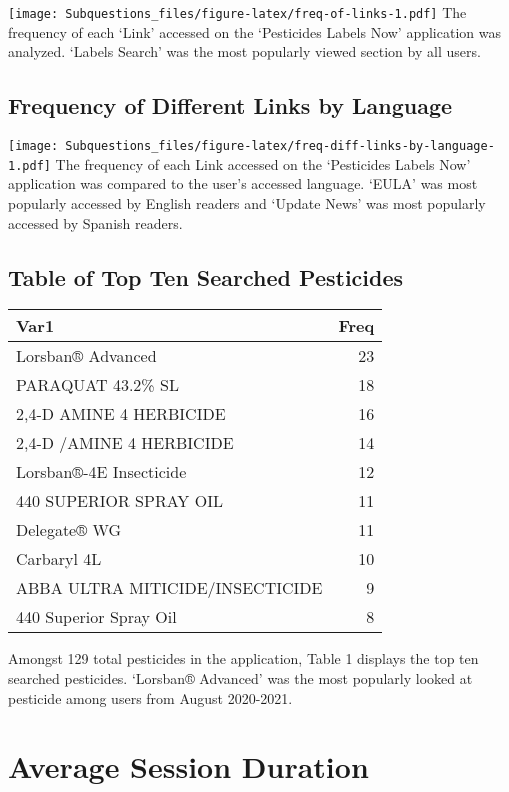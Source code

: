 \documentclass[
]{article}
\begin{document}
\texttt{[image: Subquestions\_files/figure-latex/freq-of-links-1.pdf]}
The frequency of each `Link' accessed on the `Pesticides Labels Now'
application was analyzed. `Labels Search' was the most popularly viewed
section by all users.

\hypertarget{frequency-of-different-links-by-language}{%
\subsection{Frequency of Different Links by
Language}\label{frequency-of-different-links-by-language}}

\texttt{[image: Subquestions\_files/figure-latex/freq-diff-links-by-language-1.pdf]}
The frequency of each Link accessed on the `Pesticides Labels Now'
application was compared to the user's accessed language. `EULA' was
most popularly accessed by English readers and `Update News' was most
popularly accessed by Spanish readers.

\hypertarget{table-of-top-ten-searched-pesticides}{%
\subsection{Table of Top Ten Searched
Pesticides}\label{table-of-top-ten-searched-pesticides}}

\begin{tabular}{l|r}
\hline
Var1 & Freq\\
\hline
Lorsban® Advanced & 23\\
\hline
PARAQUAT 43.2\% SL & 18\\
\hline
2,4-D AMINE 4 HERBICIDE & 16\\
\hline
2,4-D /AMINE 4 HERBICIDE & 14\\
\hline
Lorsban®-4E Insecticide & 12\\
\hline
440 SUPERIOR SPRAY OIL & 11\\
\hline
Delegate® WG & 11\\
\hline
Carbaryl 4L & 10\\
\hline
ABBA ULTRA MITICIDE/INSECTICIDE & 9\\
\hline
440 Superior Spray Oil & 8\\
\hline
\end{tabular}

Amongst 129 total pesticides in the application, Table 1 displays the
top ten searched pesticides. `Lorsban® Advanced' was the most popularly
looked at pesticide among users from August 2020-2021.

\hypertarget{average-session-duration}{%
\section{Average Session Duration}\label{average-session-duration}}
\end{document}
